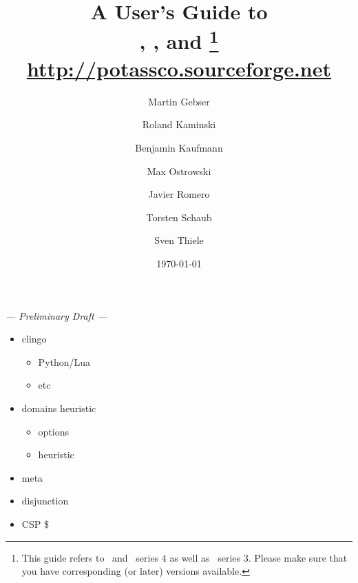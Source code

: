 \documentclass[a4paper,11pt]{article}
\author{%
Martin Gebser \and 
Roland Kaminski \and  
Benjamin Kaufmann \and 
Max Ostrowski \and  
Javier Romero \and
Torsten Schaub \and  
Sven Thiele}
\title{%
	\textbf{\huge A User's Guide to}
        \\
	\gringo, \clasp, \textbf{and} \clingo%
        \thanks{This guide refers to \gringo\ and \clingo\ series 4 as well as \clasp\ series 3.
                Please make sure that you have corresponding (or later) versions available.}
        \\[4mm] 
        \large\url{http://potassco.sourceforge.net}      
}
\date{\today}
\begin{document}
\pagestyle{plain}
\maketitle
{\hfill\large\it --- Preliminary Draft ---\hfill}


\newpage
\tableofcontents
\listoffigures
\lstlistoflistings

\pagestyle{fancy}







\begin{itemize}
\item clingo
  \begin{itemize}
  \item Python/Lua
  \item etc
  \end{itemize}
\item domains heuristic
  \begin{itemize}
  \item options
  \item heuristic
  \end{itemize}
\item meta
\item disjunction
\item CSP \$
\end{itemize}
\newpage
\appendix
%



% 
\newpage
{}
{}


\newpage
{}
{}
\printindex
\end{document}
